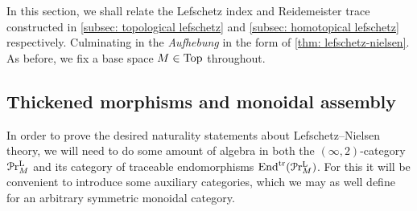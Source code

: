 In this section, we shall relate the Lefschetz index and Reidemeister trace
constructed in \cref{subsec: topological lefschetz} and
\cref{subsec: homotopical lefschetz} respectively.
Culminating in the \emph{Aufhebung} in the form of \cref{thm: lefschetz-nielsen}.
As before, we fix a base space $M\in \mathrm{Top}$ throughout.

\subsection{Thickened morphisms and monoidal assembly}
In order to prove the desired naturality statements about Lefschetz--Nielsen theory, we will need to do some amount of algebra in both the $(\infty ,2)$-category $\mathcal{P}\mathrm{r}^{\mathrm{L}}_{M}$ and its category of traceable endomorphisms $\mathrm{End}^{\mathrm{tr}}(\mathcal{P}\mathrm{r}^{\mathrm{L}}_{M})$. For this it will be convenient to introduce some auxiliary categories, which we may as well define for an arbitrary symmetric monoidal category.
